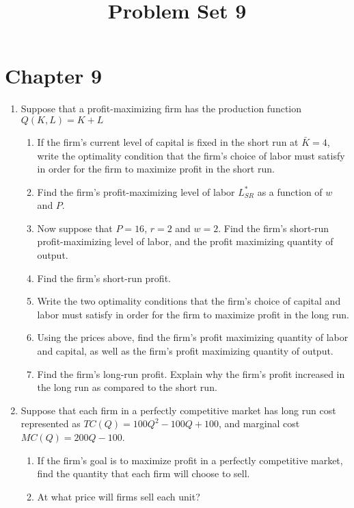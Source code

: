 \documentclass[11pt]{article}
\title{Problem Set 9}
\begin{document}
  
\section*{Chapter 9}

\begin{enumerate}
  \item Suppose that a profit-maximizing firm has the production function $Q(K, L) = K + L$
  \begin{enumerate}
    \item If the firm’s current level of capital is fixed in the short run at $\bar{K} = 4$, write the optimality condition that the firm’s choice of labor must satisfy in order for the firm to maximize profit in the short run.
    
    \item Find the firm’s profit-maximizing level of labor $L^*_{SR}$ as a function of $w$ and $P$.

    \item Now suppose that $P = 16$, $r = 2$ and $w = 2$. Find the firm’s short-run profit-maximizing level of labor, and the profit maximizing quantity of output.
    
    \item Find the firm’s short-run profit.
    
    \item Write the two optimality conditions that the firm’s choice of capital and labor must satisfy in order for the firm to maximize profit in the long run.
    
    \item Using the prices above, find the firm’s profit maximizing quantity of labor and capital, as well as the firm’s profit maximizing quantity of output.
    
    \item Find the firm’s long-run profit. Explain why the firm’s profit increased in the long run as compared to the short run.
  \end{enumerate}
  
  \item Suppose that each firm in a perfectly competitive market has long run cost represented as $TC(Q) = 100Q^2 - 100Q + 100$, and marginal cost $MC(Q) = 200Q - 100$.
  \begin{enumerate}
    \item If the firm's goal is to maximize profit in a perfectly competitive market, find the quantity that each firm will choose to sell.

    \item At what price will firms sell each unit?


\end{enumerate}
\end{enumerate}
\end{document}
